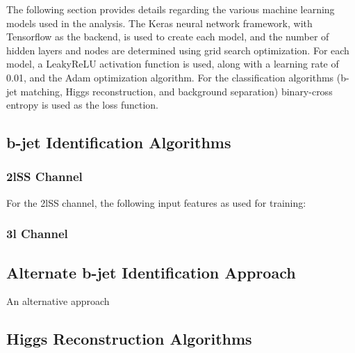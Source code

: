 
The following section provides details regarding the various machine learning models used in the analysis. The Keras neural network framework, with Tensorflow as the backend, is used to create each model, and the number of hidden layers and nodes are determined using grid search optimization. For each model, a LeakyReLU activation function is used, along with a learning rate of 0.01, and the Adam optimization algorithm. For the classification algorithms (b-jet matching, Higgs reconstruction, and background separation) binary-cross entropy is used as the loss function. 

\subsection{b-jet Identification Algorithms}
\label{subsec:topRecoApx}

\subsubsection{2lSS Channel}
\label{subsec:Apptop2lSS}
                                                                                                                     
For the 2lSS channel, the following input features as used for training:

\subsubsection{3l Channel}
\label{subsec:top3l}


\subsection{Alternate b-jet Identification Approach}
\label{subsec:altTopReco}

An alternative approach 


\subsection{Higgs Reconstruction Algorithms}
\label{subsec:higgsRecoMVA}

